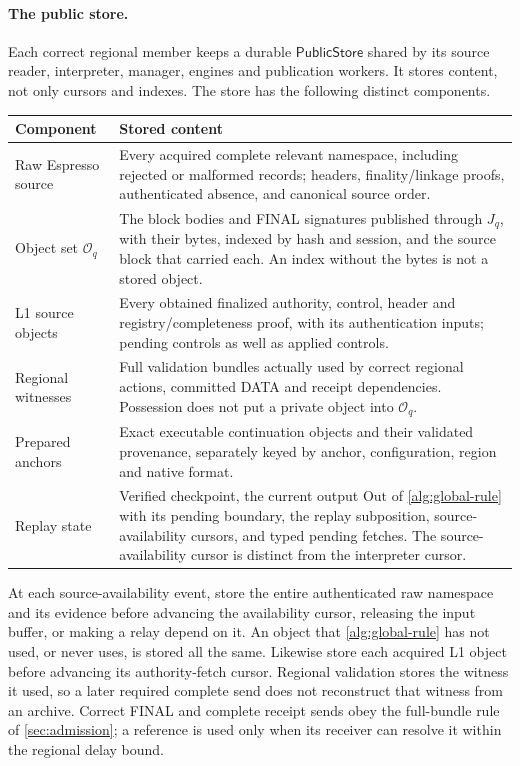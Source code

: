 \documentclass[11pt,a4paper]{article}
\newcommand{\tagg}[1]{\ensuremath{\mathsf{#1}}}
\begin{document}
\paragraph{The public store.}
Each correct regional member keeps a durable \tagg{PublicStore} shared
by its source reader, interpreter, manager, engines and publication
workers. It stores content, not only cursors and indexes. The store
has the following distinct components.
\begin{table}[htbp]\centering\small
\begin{tabularx}{\linewidth}{@{}>{\raggedright\arraybackslash}p{.24\linewidth}Y@{}}\toprule
Component & Stored content\\\midrule
Raw Espresso source & Every acquired complete relevant namespace,
including rejected or malformed records; headers, finality/linkage
proofs, authenticated absence, and canonical source order.\\
Object set $\mathcal O_q$ & The block bodies and FINAL signatures
published through $J_q$, with their bytes, indexed by hash and session,
and the source block that carried each. An index without the bytes is
not a stored object.\\
L1 source objects & Every obtained finalized authority, control,
header and registry/completeness proof, with its authentication inputs;
pending controls as well as applied controls.\\
Regional witnesses & Full validation bundles actually used by correct
regional actions, committed DATA and receipt dependencies. Possession
does not put a private object into $\mathcal O_q$.\\
Prepared anchors & Exact executable continuation objects and their
validated provenance, separately keyed by anchor, configuration,
region and native format.\\
Replay state & Verified checkpoint, the current output $\mathrm{Out}$ of
\cref{alg:global-rule} with its pending boundary, the replay subposition,
source-availability cursors, and typed pending fetches.
The source-availability cursor is distinct from the interpreter cursor.\\\bottomrule
\end{tabularx}
\end{table}

At each source-availability event, store the entire authenticated raw
namespace and its evidence before advancing the availability cursor,
releasing the input buffer, or making a relay depend on it. An object
that \cref{alg:global-rule} has not used, or never uses, is stored all
the same. Likewise store each acquired L1
object before advancing its authority-fetch cursor. Regional validation
stores the witness it used, so a later required complete send does not
reconstruct that witness from an archive. Correct FINAL and complete
receipt sends obey the full-bundle rule of \cref{sec:admission}; a
reference is used only when its receiver can resolve it within the
regional delay bound.
\end{document}
